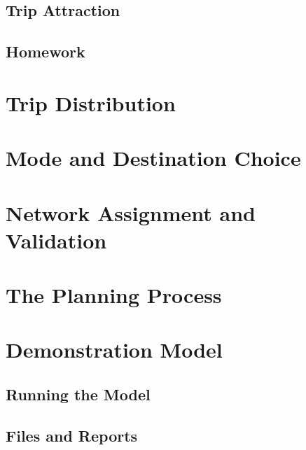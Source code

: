 \documentclass[]{book}
\begin{document}
\hypertarget{trip-attraction}{%
\section{Trip Attraction}\label{trip-attraction}}

\hypertarget{hw-tripgen}{%
\section*{Homework}\label{hw-tripgen}}

\hypertarget{chap-distribution}{%
\chapter{Trip Distribution}\label{chap-distribution}}

\hypertarget{chap-modechoice}{%
\chapter{Mode and Destination Choice}\label{chap-modechoice}}

\hypertarget{chap-assignment}{%
\chapter{Network Assignment and Validation}\label{chap-assignment}}

\hypertarget{chap-process}{%
\chapter{The Planning Process}\label{chap-process}}

\hypertarget{appendix-appendix}{%
\appendix}


\hypertarget{app-demomodel}{%
\chapter{Demonstration Model}\label{app-demomodel}}

\hypertarget{running-the-model}{%
\section{Running the Model}\label{running-the-model}}

\hypertarget{files-and-reports}{%
\section{Files and Reports}\label{files-and-reports}}
\end{document}

